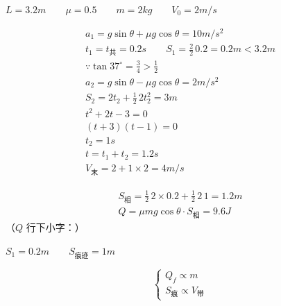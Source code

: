 \begin{problem}
$L=3.2\unit{m}$　　$\mu=0.5$　　$m=2\unit{kg}$　　$V_0=2\unit{m/s}$


\begin{solution}
\begin{gather*}
a_1=g\sin\theta+\mu g\cos\theta=10\unit{m/s^2}\\
t_1=t_{\text{共}}=0.2\unit{s}\qquad S_1=\frac{2}{2}\,0.2=0.2\unit{m}<3.2\unit{m}\\ %
\because\tan37^\circ=\frac34>\frac12\\ %
a_2=g\sin\theta-\mu g\cos\theta=2\unit{m/s^2}\\
S_2=2t_2+\frac12\,2t_2^2=3\unit{m}\\
t^2+2t-3=0\\
(t+3)(t-1)=0\\
t_2=1\unit{s}\\
t=t_1+t_2=1.2\unit{s}\\
V_{\text{末}}=2+1\times2=4\unit{m/s}
\end{gather*}


\begin{gather*}
S_{\text{相}}=\frac12\,2\times0.2+\frac12\,2\,1=1.2\unit{m}\\
Q=\mu mg\cos\theta\cdot S_{\text{相}}=9.6\unit{J}
\end{gather*}
（$Q$ 行下小字：）
\end{solution}


$S_1=0.2\unit{m}$　　$S_{\text{痕迹}}=1\unit{m}$

\[
\left\{\begin{array}{l}
Q_f\propto m\\
S_{\text{痕}}\propto V_{\text{带}}
\end{array}\right.
\] %
\end{problem}

